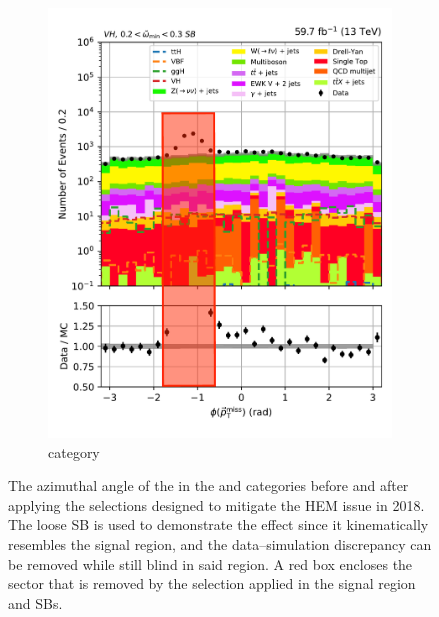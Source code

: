 \begin{figure}[htbp]
\begin{subfigure}[b]{0.34\textwidth}
        \includegraphics[width=\textwidth]{figures/hem_issue/sideband_4/met_phi/met_phi_VH_before_annotated.pdf}
        \caption{\VH category}
    \end{subfigure}
    \caption[The azimuthal angle of the \ptvecmiss in the \ttH and \VH categories before and after applying the selections designed to mitigate the HEM issue in 2018]{The azimuthal angle of the \ptvecmiss in the \ttH and \VH categories before and after applying the selections designed to mitigate the HEM issue in 2018. The loose \omegaTilde \gls{SB} is used to demonstrate the effect since it kinematically resembles the signal region, and the data--simulation discrepancy can be removed while still blind in said region. A red box encloses the sector that is removed by the selection applied in the signal region and \glspl{SB}.}
    \label{fig:htoinv_hem_issue_met_phi}
\end{figure}


